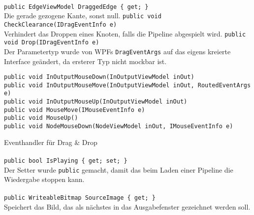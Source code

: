 \paragraph{}
\begin{itemize}
	\add \verb!public EdgeViewModel DraggedEdge { get; }! \\
	Die gerade gezogene Kante, sonst null.
	\add \verb!public void CheckClearance(IDragEventInfo e)! \\
	Verhindert das Droppen eines Knoten, falls die Pipeline abgespielt wird.
	\change \verb!public void Drop(IDragEventInfo e)! \\
	Der Parametertyp wurde von WPFs \verb!DragEventArgs! auf das eigens kreierte Interface  geändert, da ersterer Typ nicht mockbar ist.
	\add \begin{verbatim}
public void InOutputMouseDown(InOutputViewModel inOut)
public void InOutputMouseMove(InOutputViewModel inOut, RoutedEventArgs e)
public void InOutputMouseUp(InOutputViewModel inOut)
public void MouseMove(IMouseEventInfo e)
public void MouseUp()
public void NodeMouseDown(NodeViewModel inOut, IMouseEventInfo e)
	\end{verbatim}
	Eventhandler für Drag \& Drop
\end{itemize}

\paragraph{}
\begin{itemize}
	\change \verb!public bool IsPlaying { get; set; }! \\
	Der Setter wurde \verb!public! gemacht, damit das  beim Laden einer Pipeline die Wiedergabe stoppen kann.
\end{itemize}

\paragraph{}
\begin{itemize}
	\add \verb!public WriteableBitmap SourceImage { get; }! \\
	Speichert das Bild, das als nächstes in das Ausgabefenster gezeichnet werden soll.
\end{itemize}


\subsection{}

